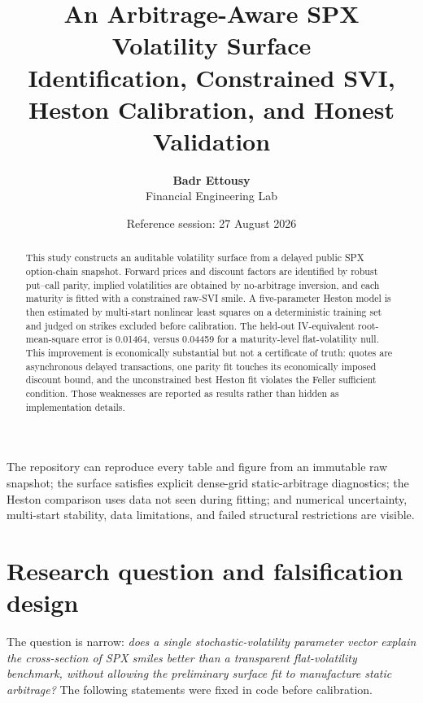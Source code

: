 \documentclass[11pt,oneside]{article}
\title{\vspace{-1.2cm}\textbf{\Huge An Arbitrage-Aware SPX Volatility Surface}\\[0.4em]
       \Large Identification, Constrained SVI, Heston Calibration, and Honest Validation}
\author{\textbf{Badr Ettousy}\\Financial Engineering Lab}
\date{Reference session: 27 August 2026}
\begin{document}
\maketitle

\begin{abstract}
This study constructs an auditable volatility surface from a delayed public SPX
option-chain snapshot. Forward prices and discount factors are identified by robust
put--call parity, implied volatilities are obtained by no-arbitrage inversion, and
each maturity is fitted with a constrained raw-SVI smile. A five-parameter Heston
model is then estimated by multi-start nonlinear least squares on a deterministic
training set and judged on strikes excluded before calibration. The held-out
IV-equivalent root-mean-square error is 0.01464, versus 0.04459 for a maturity-level
flat-volatility null. This improvement is economically substantial but not a
certificate of truth: quotes are asynchronous delayed transactions, one parity fit
touches its economically imposed discount bound, and the unconstrained best Heston
fit violates the Feller sufficient condition. Those weaknesses are reported as
results rather than hidden as implementation details.
\end{abstract}

\begin{claimbox}
The repository can reproduce every table and figure from an immutable raw snapshot;
the surface satisfies explicit dense-grid static-arbitrage diagnostics; the Heston
comparison uses data not seen during fitting; and numerical uncertainty, multi-start
stability, data limitations, and failed structural restrictions are visible.
\end{claimbox}

\section{Research question and falsification design}

The question is narrow: \emph{does a single stochastic-volatility parameter vector
explain the cross-section of SPX smiles better than a transparent flat-volatility
benchmark, without allowing the preliminary surface fit to manufacture static
arbitrage?} The following statements were fixed in code before calibration.
\end{document}
